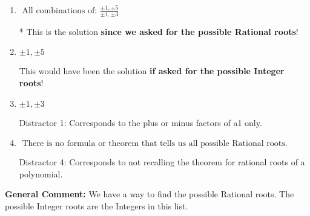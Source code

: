 \documentclass{extbook}[14pt]
\begin{document}
\begin{enumerate}
{\begin{enumerate}[label=\Alph*.]
 Distractor 3: Corresponds to the plus or minus of the inverse quotient (an/a0) of the factors. 
\item \( \text{ All combinations of: }\frac{\pm 1,\pm 5}{\pm 1,\pm 3} \)

* This is the solution \textbf{since we asked for the possible Rational roots}!
\item \( \pm 1,\pm 5 \)

This would have been the solution \textbf{if asked for the possible Integer roots}!
\item \( \pm 1,\pm 3 \)

 Distractor 1: Corresponds to the plus or minus factors of a1 only.
\item \( \text{ There is no formula or theorem that tells us all possible Rational roots.} \)

 Distractor 4: Corresponds to not recalling the theorem for rational roots of a polynomial.
\end{enumerate}

\textbf{General Comment:} We have a way to find the possible Rational roots. The possible Integer roots are the Integers in this list.
}
\end{enumerate}
\end{document}
